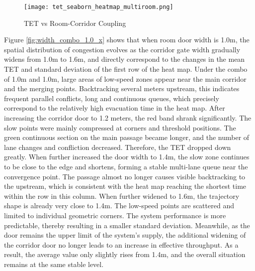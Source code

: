 \begin{figure}[h]
    \centering
    \texttt{[image: tet\_seaborn\_heatmap\_multiroom.png]}
    \caption{TET vs Room-Corridor Coupling}
    \label{fig:tet_vs_room_corridor_coupling}
\end{figure}

Figure \ref{fig:width_combo_1.0_x} shows that when room door width is 1.0m, the spatial distribution of congestion evolves as the corridor gate width gradually widens from 1.0m to 1.6m, and directly correspond to the changes in the mean TET and standard deviation of the first row of the heat map. Under the combo of 1.0m and 1.0m, large areas of low-speed zones appear near the main corridor and the merging points. Backtracking several meters upstream, this indicates frequent parallel conflicts, long and continuous queues, which precisely correspond to the relatively high evacuation time in the heat map. After increasing the corridor door to 1.2 meters, the red band shrank significantly. The slow points were mainly compressed at corners and threshold positions. The green continuous section on the main passage became longer, and the number of lane changes and confliction decreased. Therefore, the TET dropped down greatly. When further increased the door width to 1.4m, the slow zone continues to be close to the edge and shortens, forming a stable multi-lane queue near the convergence point. The passage almost no longer causes visible backtracking to the upstream, which is consistent with the heat map reaching the shortest time within the row in this column. When further widened to 1.6m, the trajectory shape is already very close to 1.4m. The low-speed points are scattered and limited to individual geometric corners. The system performance is more predictable, thereby resulting in a smaller standard deviation. Meanwhile, as the door remains the upper limit of the system's supply, the additional widening of the corridor door no longer leads to an increase in effective throughput. As a result, the average value only slightly rises from 1.4m, and the overall situation remains at the same stable level.

